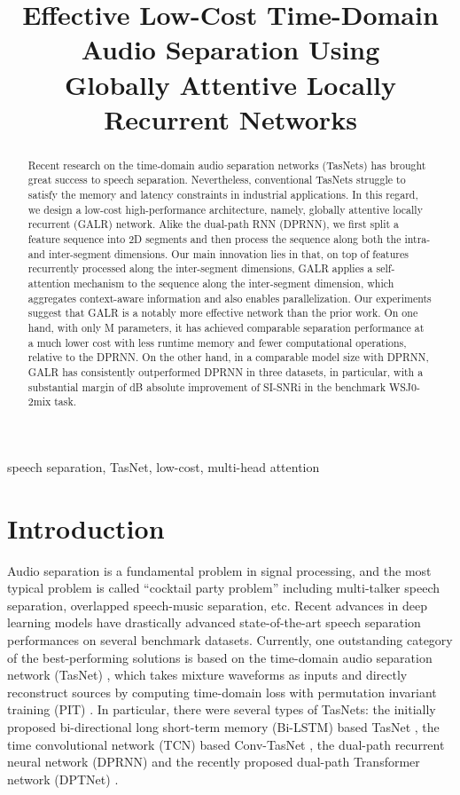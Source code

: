 \documentclass{article}
\title{Effective Low-Cost Time-Domain Audio Separation Using\\Globally Attentive Locally Recurrent Networks}
\begin{document}
\ninept
\maketitle
\begin{abstract}
Recent research on the time-domain audio separation networks (TasNets) has brought great success to speech separation. Nevertheless, conventional TasNets struggle to satisfy the memory and latency constraints in industrial applications. In this regard, we design a low-cost high-performance architecture, namely, globally attentive locally recurrent (GALR) network. Alike the dual-path RNN (DPRNN), we first split a feature sequence into 2D segments and then process the sequence along both the intra- and inter-segment dimensions. Our main innovation lies in that, on top of features recurrently processed along the inter-segment dimensions, GALR applies a self-attention mechanism to the sequence along the inter-segment dimension, which aggregates context-aware information and also enables parallelization. Our experiments suggest that GALR is a notably more effective network than the prior work. On one hand, with only M parameters, it has achieved comparable separation performance at a much lower cost with  less runtime memory and  fewer computational operations, relative to the DPRNN. On the other hand, in a comparable model size with DPRNN, GALR has consistently outperformed DPRNN in three datasets, in particular, with a substantial margin of dB absolute improvement of SI-SNRi in the benchmark WSJ0-2mix task.
\end{abstract}
\begin{keywords}
speech separation, TasNet, low-cost, multi-head attention
\end{keywords}



\section{Introduction}

Audio separation is a fundamental problem in signal processing, and the most typical problem is called ``cocktail party problem'' \cite{cherry1953some} including multi-talker speech separation, overlapped speech-music separation, etc.
Recent advances in deep learning models \cite{luo2019dual, liu2019divide, morrone2019face, yu2020audio} have drastically advanced state-of-the-art speech separation performances on several benchmark datasets.
Currently, one outstanding category of the best-performing solutions is based on the time-domain audio separation network (TasNet) \cite{luo2018tasnet}, which takes mixture waveforms as inputs and directly reconstruct sources by computing time-domain loss with permutation invariant training (PIT) \cite{yu2017permutation, kolbaek2017multitalker}. In particular, there were several types of TasNets: the initially proposed bi-directional long short-term memory (Bi-LSTM) based TasNet \cite{luo2018tasnet}, the time convolutional network (TCN) based Conv-TasNet \cite{bai2018empirical, luo2019conv}, the dual-path recurrent neural network (DPRNN) \cite{luo2019dual} and the recently proposed dual-path Transformer network (DPTNet) \cite{chen2020dual}.
\end{document}
